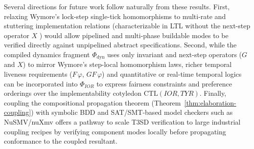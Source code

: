 Several directions for future work follow naturally from these results. First, relaxing Wymore's lock-step single-tick homomorphisms to multi-rate and stuttering implementation relations (characterizable in LTL without the next-step operator $X$ \citep{Lamport2002,BrowneClarkeGrumberg1988}) would allow pipelined and multi-phase buildable modes to be verified directly against unpipelined abstract specifications. Second, while the compiled dynamics fragment $\Phi_{\mathrm{dyn}}$ uses only invariant and next-step operators ($G$ and $X$) to mirror Wymore's step-local homomorphism laws, richer temporal liveness requirements ($F\,\varphi$, $GF\,\varphi$) and quantitative or real-time temporal logics can be incorporated into $\Phi_{IOR}$ to express fairness constraints and preference orderings over the implementability cotyledon $\mathrm{CTL}(IOR,TYR)$. Finally, coupling the compositional propagation theorem (Theorem~\ref{thm:elaboration-coupling}) with symbolic BDD and SAT/SMT-based model checkers such as NuSMV/nuXmv \citep{CavadaEtAl2014} offers a pathway to scale T3SD verification to large industrial coupling recipes by verifying component modes locally before propagating conformance to the coupled resultant.
